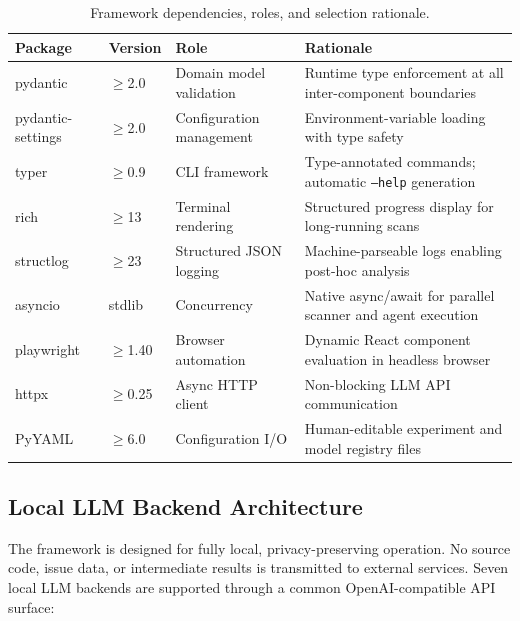 \begin{table}[htbp]
\caption{Framework dependencies, roles, and selection rationale.}
\label{tab:stack_detail}
\centering\small
\renewcommand{\arraystretch}{1.2}
\begin{tabular}{llp{}p{}}
\toprule
\textbf{Package} & \textbf{Version} & \textbf{Role} & \textbf{Rationale} \\
\midrule
pydantic        & $\geq$2.0  & Domain model validation & Runtime type enforcement at all inter-component boundaries \\
pydantic-settings & $\geq$2.0 & Configuration management & Environment-variable loading with type safety \\
typer           & $\geq$0.9  & CLI framework & Type-annotated commands; automatic \texttt{--help} generation \\
rich            & $\geq$13   & Terminal rendering & Structured progress display for long-running scans \\
structlog       & $\geq$23   & Structured JSON logging & Machine-parseable logs enabling post-hoc analysis \\
asyncio         & stdlib     & Concurrency & Native async/await for parallel scanner and agent execution \\
playwright      & $\geq$1.40 & Browser automation & Dynamic React component evaluation in headless browser \\
httpx           & $\geq$0.25 & Async HTTP client & Non-blocking LLM API communication \\
PyYAML          & $\geq$6.0  & Configuration I/O & Human-editable experiment and model registry files \\
\bottomrule
\end{tabular}
\end{table}

\subsection{Local LLM Backend Architecture}

The framework is designed for fully local, privacy-preserving operation.  No
source code, issue data, or intermediate results is transmitted to external
services.  Seven local LLM backends are supported through a common
OpenAI-compatible API surface:

